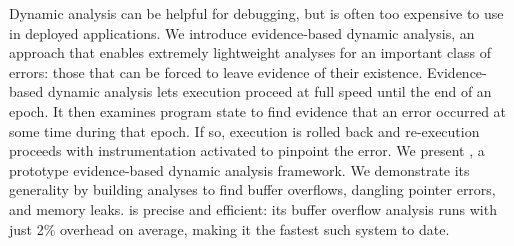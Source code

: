 Dynamic analysis can be helpful for debugging, but is often too
expensive to use in deployed applications. We introduce evidence-based
dynamic analysis, an approach that enables extremely lightweight
analyses for an important class of errors: those that can be forced to
leave evidence of their existence. Evidence-based dynamic analysis lets
execution proceed at full speed until the end of an epoch. It then
examines program state to find evidence that an error occurred at some
time during that epoch. If so, execution is rolled back and
re-execution proceeds with instrumentation activated to pinpoint the
error. We present \doubletake{}, a prototype evidence-based dynamic
analysis framework. We demonstrate its generality by building analyses
to find buffer overflows, dangling pointer errors, and memory
leaks. \doubletake{} is precise and efficient: its buffer overflow
analysis runs with just 2\% overhead on average, making it the fastest
such system to date.

